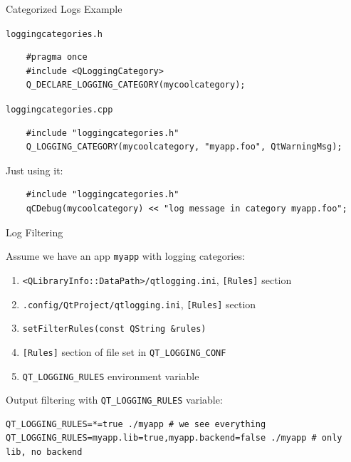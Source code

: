 \documentclass[t,compress,aspectratio=169]{beamer}
\begin{document}
\begin{frame}[fragile]
    {Categorized Logs}
    {Example}

    \texttt{loggingcategories.h}
    \begin{minipage}{.95\linewidth}
    \begin{lstlisting}
    #pragma once
    #include <QLoggingCategory>
    Q_DECLARE_LOGGING_CATEGORY(mycoolcategory);
    \end{lstlisting}
    \end{minipage}
    \medskip

    \texttt{loggingcategories.cpp}
    \begin{minipage}{.95\linewidth}
    \begin{lstlisting}
    #include "loggingcategories.h"
    Q_LOGGING_CATEGORY(mycoolcategory, "myapp.foo", QtWarningMsg);
    \end{lstlisting}
    \end{minipage}
    \medskip

    Just using it:
    \begin{minipage}{.95\linewidth}
    \begin{lstlisting}
    #include "loggingcategories.h"
    qCDebug(mycoolcategory) << "log message in category myapp.foo";
    \end{lstlisting}
    \end{minipage}
\end{frame}

\begin{frame}[fragile]
    {Log Filtering}

    Assume we have an app \texttt{myapp} with logging categories:

    \begin{enumerate}
        \item \texttt{<QLibraryInfo::DataPath>/qtlogging.ini}, \texttt{[Rules]} section
        \item \texttt{.config/QtProject/qtlogging.ini}, \texttt{[Rules]} section
        \item \texttt{setFilterRules(const QString \&rules)}
        \item \texttt{[Rules]} section of file set in \texttt{QT\_LOGGING\_CONF}
        \item \texttt{QT\_LOGGING\_RULES} environment variable
    \end{enumerate}
    \bigskip

    Output filtering with \texttt{QT\_LOGGING\_RULES} variable:

    \begin{minipage}{.95\linewidth}
    \begin{lstlisting}
QT_LOGGING_RULES=*=true ./myapp # we see everything
QT_LOGGING_RULES=myapp.lib=true,myapp.backend=false ./myapp # only lib, no backend
    \end{lstlisting}
    \end{minipage}
\end{frame}
\end{document}
